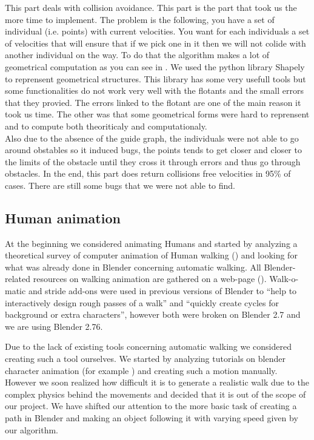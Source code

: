 This part deals with collision avoidance. This part is the part that took us the more time to implement. The problem is the following, you have a set of individual (i.e. points) with current velocities. You want for each individuals a set of velocities that will ensure that if we pick one in it then we will not colide with another individual on the way. To do that the algorithm makes a lot of geometrical computation as you can see in \cite{vandenBerg2011}. We used the python library Shapely to reprensent geometrical structures. This library has some very usefull tools but some functionalities do not work very well with the flotants and the small errors that they provied. The errors linked to the flotant are one of the main reason it took us time. The other was that some geometrical forms were hard to reprensent and to compute both theoriticaly and computationaly.\\
Also due to the absence of the guide graph, the individuals were not able to go around obstables so it induced bugs, the points tends to get closer and closer to the limits of the obstacle until they cross it through errors and thus go through obstacles.
In the end, this part does return collisions free velocities in 95\% of cases. There are still some bugs that we were not able to find.

\subsection{Human animation}

At the beginning we considered animating Humans and started by
analyzing a theoretical survey of computer animation of Human walking
(\cite{th_walking}) and looking for what was already done in Blender
concerning automatic walking. All Blender-related resources on walking
animation are gathered on a web-page
(\cite{blwikiwalking}). Walk-o-matic and stride add-ons were used in
previous versions of Blender to ``help to interactively design rough
passes of a walk'' and ``quickly create cycles for background or extra
characters'', however both were broken on Blender 2.7 and we are using
Blender 2.76.

Due to the lack of existing tools concerning automatic walking we
considered creating such a tool ourselves. We started by analyzing
tutorials on blender character animation (for example
\cite{tuto_walk}) and creating such a motion manually. However we soon
realized how difficult it is to generate a realistic walk due to the
complex physics behind the movements and decided that it is out of the
scope of our project. We have shifted our attention to the more basic
task of creating a path in Blender and making an object following it
with varying speed given by our algorithm.


